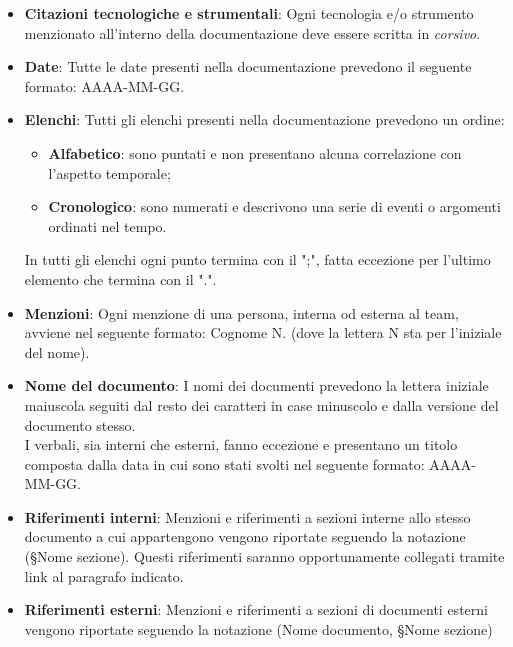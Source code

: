 \documentclass[10pt, a4paper]{article}
\begin{document}
    \begin{itemize}

        \item {\textbf{Citazioni tecnologiche e strumentali}}: Ogni tecnologia e/o strumento menzionato all'interno della documentazione 
        deve essere scritta in \textit{corsivo}.
        
        \item {\textbf{Date}}: Tutte le date presenti nella documentazione prevedono il seguente formato: AAAA-MM-GG.
        
        \item {\textbf{Elenchi}}: Tutti gli elenchi presenti nella documentazione prevedono un ordine:
            \begin{itemize}
                \item \textbf{Alfabetico}: sono puntati e non presentano alcuna correlazione con l'aspetto temporale;
                \item \textbf{Cronologico}: sono  numerati e descrivono una serie di eventi o argomenti ordinati nel tempo.
            \end{itemize}
        In tutti gli elenchi ogni punto termina con il ";", fatta eccezione per l'ultimo elemento che termina con il ".".
        
        \item {\textbf{Menzioni}}: Ogni menzione di una persona, interna od esterna al team, avviene nel seguente formato: Cognome N. 
        (dove la lettera N sta per l'iniziale del nome).
        

        \item {\textbf{Nome del documento}}: I nomi dei documenti prevedono la lettera iniziale maiuscola seguiti dal resto dei caratteri 
        in case minuscolo e dalla versione del documento stesso.\\
        I verbali, sia interni che esterni, fanno eccezione e presentano un titolo composta dalla data in cui sono stati svolti nel 
        seguente formato: AAAA-MM-GG.

        \item {\textbf{Riferimenti interni}}: Menzioni e riferimenti a sezioni interne allo stesso documento a cui appartengono vengono 
        riportate seguendo la notazione (\S Nome sezione). Questi riferimenti saranno opportunamente collegati tramite link al paragrafo 
        indicato.
        
        \item {\textbf{Riferimenti esterni}}: Menzioni e riferimenti a sezioni di documenti esterni vengono riportate seguendo la notazione 
        (Nome documento, \S Nome sezione)


\end{itemize}
\end{document}

